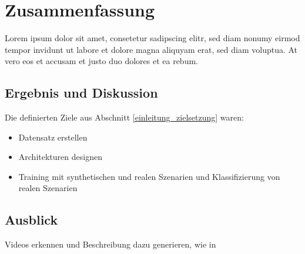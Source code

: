 
\chapter{Zusammenfassung}
\label{zusammenfassung}

Lorem ipsum dolor sit amet, consetetur sadipscing elitr, sed diam nonumy eirmod tempor invidunt ut labore et dolore magna aliquyam erat, sed diam voluptua. At vero eos et accusam et justo duo dolores et ea rebum. 


\section{Ergebnis und Diskussion}
\label{zusammenfassung_ergebnis}

Die definierten Ziele aus Abschnitt \ref{einleitung_zielsetzung} waren:

\begin{itemize}
\item Datensatz erstellen
\item Architekturen designen
\item Training mit synthetischen und realen Szenarien und Klassifizierung von realen Szenarien
\end{itemize} 

 
 \section{Ausblick}
 \label{zusammenfassung_ausblick}

Videos erkennen und Beschreibung dazu generieren, wie in \cite{donahue2015long}
